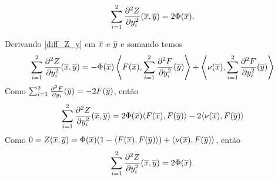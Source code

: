 
\begin{proposicao}
	\begin{equation}\label{2_diff_Z_y}
	\sum_{i=1}^2 \frac{\partial^2 Z}{\partial y_i^2}(\overline{x},\overline{y}) = 2 \Phi(\overline{x}).
	\end{equation}
\end{proposicao}

\begin{demonstracao}
	Derivando \eqref{diff_Z_y} em $\overline{x}$ e $\overline{y}$ e somando  temos
	\begin{equation*}
		\sum_{i=1}^2 \frac{\partial^2 Z}{\partial y_i^2}(\overline{x},\overline{y}) = - \Phi(\overline{x}) \left\langle F(\overline{x}), \sum_{i=1}^2 \frac{\partial^2 F}{\partial y_i^2}(\overline{y}) \right\rangle + \left\langle \nu(\overline{x}), \sum_{i=1}^2 \frac{\partial^2 F}{\partial y_i^2}(\overline{y}) \right\rangle
	\end{equation*}	
	Como $\sum_{i=1}^2 \frac{\partial^2 F}{\partial y_i}(\overline{y}) = -2 F(\overline{y})$, então
	\begin{equation*}
		\sum_{i=1}^2 \frac{\partial^2 Z}{\partial y_i^2}(\overline{x},\overline{y}) = 2 \Phi(\overline{x}) \langle F(\overline{x}), F(\overline{y}) \rangle - 2 \langle \nu(\overline{x}), F(\overline{y}) \rangle
	\end{equation*}	
	Como $0 = Z(\overline{x},\overline{y}) = \Phi(\overline{x})(1 - \langle F(\overline{x}), F(\overline{y}) \rangle) + \langle \nu(\overline{x}), F(\overline{y}) \rangle$, então
	\begin{equation*}
		\sum_{i=1}^2 \frac{\partial^2 Z}{\partial y_i^2}(\overline{x},\overline{y}) = 2 \Phi(\overline{x}).
	\end{equation*}
\end{demonstracao}


